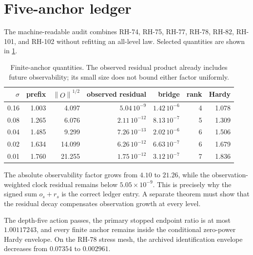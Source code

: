 \documentclass[11pt]{article}
\theoremstyle{definition}
\theoremstyle{remark}
\newcommand{\norm}[1]{\left\lVert#1\right\rVert}
\begin{document}
\section{Five-anchor ledger}
\label{sec:audit}

The machine-readable audit combines RH-74, RH-75, RH-77, RH-78, RH-82,
RH-101, and RH-102 without refitting an all-level law.  Selected quantities
are shown in \cref{tab:anchors}.

\begin{table}[t]
\centering
\caption{Finite-anchor quantities.  The observed residual product already
includes future observability; its small size does not bound either factor
uniformly.}
\label{tab:anchors}
\begin{tabular}{@{}rrrrrrr@{}}
\toprule
$\sigma$ & prefix & $\norm O^{1/2}$ & observed residual & bridge & rank & Hardy\\
\midrule
0.16 & 1.003 & 4.097  & $5.04\,10^{-9}$  & $1.42\,10^{-6}$ & 4 & 1.078\\
0.08 & 1.265 & 6.076  & $2.11\,10^{-12}$ & $8.13\,10^{-7}$ & 5 & 1.309\\
0.04 & 1.485 & 9.299  & $7.26\,10^{-13}$ & $2.02\,10^{-6}$ & 6 & 1.506\\
0.02 & 1.634 & 14.099 & $6.26\,10^{-12}$ & $6.63\,10^{-7}$ & 6 & 1.679\\
0.01 & 1.760 & 21.255 & $1.75\,10^{-12}$ & $3.12\,10^{-7}$ & 7 & 1.836\\
\bottomrule
\end{tabular}
\end{table}

The absolute observability factor grows from $4.10$ to $21.26$, while the
observation-weighted clock residual remains below $5.05\times10^{-9}$.  This
is precisely why the signed sum $o_s+r_s$ is the correct ledger entry.  A
separate theorem must show that the residual decay compensates observation
growth at every level.

The depth-five action passes, the primary stopped endpoint ratio is at most
$1.00117243$, and every finite anchor remains inside the conditional
zero-power Hardy envelope.  On the RH-78 stress mesh, the archived
identification envelope decreases from $0.07354$ to $0.002961$.
\end{document}

